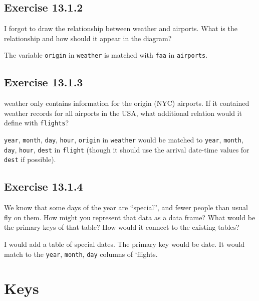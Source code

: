 \documentclass[]{book}
\theoremstyle{plain}
\theoremstyle{remark}
\begin{document}
\hypertarget{exercise-13.1.2}{%
\subsection*{\texorpdfstring{Exercise
{13.1.2}}{Exercise 13.1.2}}\label{exercise-13.1.2}}

I forgot to draw the relationship between weather and airports. What is
the relationship and how should it appear in the diagram?

The variable \texttt{origin} in \texttt{weather} is matched with
\texttt{faa} in \texttt{airports}.

\hypertarget{exercise-13.1.3}{%
\subsection*{\texorpdfstring{Exercise
{13.1.3}}{Exercise 13.1.3}}\label{exercise-13.1.3}}

weather only contains information for the origin (NYC) airports. If it
contained weather records for all airports in the USA, what additional
relation would it define with \texttt{flights}?

\texttt{year}, \texttt{month}, \texttt{day}, \texttt{hour},
\texttt{origin} in \texttt{weather} would be matched to \texttt{year},
\texttt{month}, \texttt{day}, \texttt{hour}, \texttt{dest} in
\texttt{flight} (though it should use the arrival date-time values for
\texttt{dest} if possible).

\hypertarget{exercise-13.1.4}{%
\subsection*{\texorpdfstring{Exercise
{13.1.4}}{Exercise 13.1.4}}\label{exercise-13.1.4}}

We know that some days of the year are ``special'', and fewer people
than usual fly on them. How might you represent that data as a data
frame? What would be the primary keys of that table? How would it
connect to the existing tables?

I would add a table of special dates. The primary key would be date. It
would match to the \texttt{year}, \texttt{month}, \texttt{day} columns
of `flights.

\hypertarget{keys}{%
\section{Keys}\label{keys}}
\end{document}
